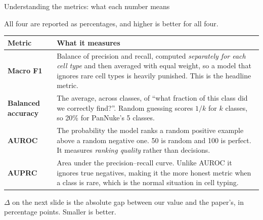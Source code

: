 \documentclass[aspectratio=169,11pt]{beamer}
\newcommand{\hl}[1]{\textcolor{haem}{\textbf{#1}}}
\begin{document}
\begin{frame}{Understanding the metrics: what each number means}

  All four are reported as percentages, and higher is better for all four.

  \vspace{0.2em}
  \begin{center}\footnotesize
  \begin{tabular}{@{}p{2.4cm}p{9.8cm}@{}}
    \toprule
    \textbf{Metric} & \textbf{What it measures} \\
    \midrule
    \hl{Macro F1} &
    Balance of precision and recall, computed \emph{separately for each cell
    type} and then averaged with equal weight, so a model that ignores rare cell
    types is heavily punished. This is the headline metric. \\
    \hl{Balanced accuracy} &
    The average, across classes, of ``what fraction of this class did we
    correctly find?''. Random guessing scores $1/k$ for $k$ classes, so 20\% for
    PanNuke's 5 classes. \\
    \hl{AUROC} &
    The probability the model ranks a random positive example above a random
    negative one. 50 is random and 100 is perfect. It measures \emph{ranking
    quality} rather than decisions. \\
    \hl{AUPRC} &
    Area under the precision--recall curve. Unlike AUROC it ignores true
    negatives, making it the more honest metric when a class is rare, which is
    the normal situation in cell typing. \\
    \bottomrule
  \end{tabular}
  \end{center}

  \vspace{0.2em}
  {\scriptsize \textbf{$\Delta$} on the next slide is the absolute gap between
  our value and the paper's, in percentage points. Smaller is better.}

\end{frame}
\end{document}
